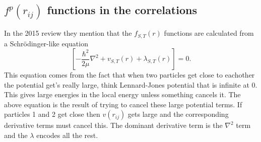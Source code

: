 \subsection{$f^p(r_{ij})$ functions in the correlations}
In the 2015 review they mention that the $f_{S,T}(r)$ functions are calculated from a Schr\"odinger-like equation
\begin{equation*}
   \left[-\frac{\hbar^2}{2\mu}\nabla^2+v_{S,T}(r)+\lambda_{S,T}(r)\right] = 0.
\end{equation*}
This equation comes from the fact that when two particles get close to eachother the potential get's really large, think Lennard-Jones potential that is infinite at 0. This gives large energies in the local energy unless something cancels it. The above equation is the result of trying to cancel these large potential terms. If particles 1 and 2 get close then $v(r_{ij})$ gets large and the corresponding derivative terms must cancel this. The dominant derivative term  is the $\nabla^2$ term and the $\lambda$ encodes all the rest.
